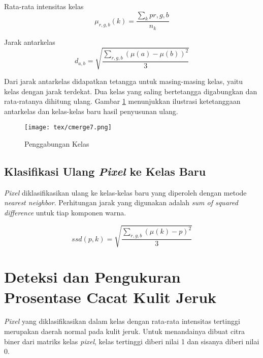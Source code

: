 \documentclass[laporan.tex]{subfiles}
\begin{document}
Rata-rata intensitas kelas
\begin{equation}
	\mu_{r,g,b}(k) = \frac{\sum_k p{r,g,b}}{n_k}
\end{equation}

Jarak antarkelas
\begin{equation}
	d_{a,b} = \sqrt{\frac{\sum_{r,g,b} (\mu(a) - \mu(b))^2}{3}}
\end{equation}

Dari jarak antarkelas didapatkan tetangga untuk masing-masing kelas, yaitu kelas dengan jarak terdekat. Dua kelas yang saling bertetangga digabungkan dan rata-ratanya dihitung ulang. Gambar \ref{fig:neighborhood} menunjukkan ilustrasi ketetanggaan antarkelas dan kelas-kelas baru hasil penyusunan ulang.

\begin{figure}[h]
\centering
\texttt{[image: tex/cmerge7.png]}
\caption{Penggabungan Kelas}
\label{fig:neighborhood}
\end{figure}

\subsection{Klasifikasi Ulang \emph{Pixel} ke Kelas Baru}

\emph{Pixel} diklasifikasikan ulang ke kelas-kelas baru yang diperoleh dengan metode \emph{nearest neighbor}. Perhitungan jarak yang digunakan adalah \emph{sum of squared difference} untuk tiap komponen warna.

\begin{equation}
ssd(p,k) = \sqrt{\frac{\sum_{r,g,b} (\mu(k) - p)^2}{3}}
\end{equation}

\section{Deteksi dan Pengukuran Prosentase Cacat Kulit Jeruk}


\emph{Pixel} yang diklasifikasikan dalam kelas dengan rata-rata intensitas tertinggi merupakan daerah normal pada kulit jeruk. Untuk menandainya dibuat citra biner dari matriks kelas \emph{pixel}, kelas tertinggi diberi nilai 1 dan sisanya diberi nilai 0.

\end{document}
